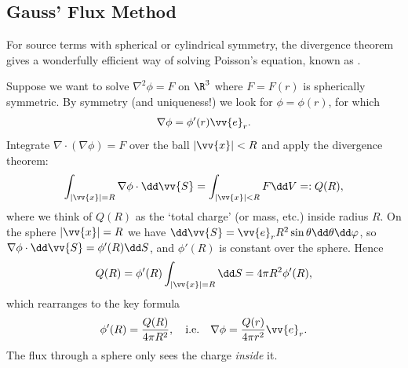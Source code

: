 \subsection{Gauss' Flux Method}

For source terms with spherical or cylindrical symmetry, the divergence theorem gives a wonderfully efficient way of solving Poisson's equation, known as .

Suppose we want to solve $\nabla^2 \phi = F$ on $\R^3$ where $F = F(r)$ is spherically symmetric. By symmetry (and uniqueness!) we look for $\phi = \phi(r)$, for which
$$
\nabla \phi = \phi'(r) \vv{e}_r.
$$
Integrate $\nabla \cdot (\nabla \phi) = F$ over the ball $|\vv{x}| < R$ and apply the divergence theorem:
$$
\int_{|\vv{x}| = R} \nabla \phi \cdot \dd \vv{S} = \int_{|\vv{x}| < R} F \dd V =: Q(R),
$$
where we think of $Q(R)$ as the `total charge' (or mass, etc.) inside radius $R$. On the sphere $|\vv{x}| = R$ we have $\dd \vv{S} = \vv{e}_r R^2 \sin \theta \dd \theta \dd \varphi$, so $\nabla \phi \cdot \dd \vv{S} = \phi'(R) \dd S$, and $\phi'(R)$ is constant over the sphere. Hence
$$
Q(R) = \phi'(R) \int_{|\vv{x}| = R} \dd S = 4 \pi R^2 \phi'(R),
$$
which rearranges to the key formula
$$
\phi'(R) = \frac{Q(R)}{4 \pi R^2}, \quad \text{i.e.} \quad \nabla \phi = \frac{Q(r)}{4 \pi r^2} \vv{e}_r.
$$
The flux through a sphere only sees the charge \emph{inside} it.

\begin{center}
\end{center}

